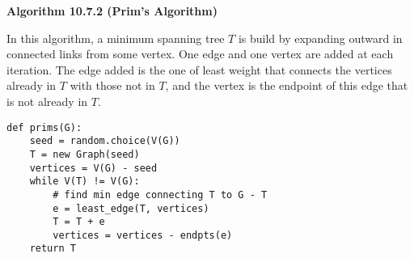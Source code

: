 \documentclass[a4paper]{article}
\newcommand{\subheading}[1]{{\scriptsize\textbf{#1}}}
\begin{document}
\begin{multicols*}{4}
\subheading{Algorithm 10.7.2 (Prim's Algorithm)}

In this algorithm, a minimum spanning tree $T$ is build by expanding outward in
connected links from some vertex. One edge and one vertex are added at each
iteration. The edge added is the one of least weight that connects the vertices
already in $T$ with those not in $T$, and the vertex is the endpoint of this
edge that is not already in $T$.
\begin{center}
\begin{BVerbatim}
def prims(G):
    seed = random.choice(V(G))
    T = new Graph(seed)
    vertices = V(G) - seed
    while V(T) != V(G):
        # find min edge connecting T to G - T
        e = least_edge(T, vertices)
        T = T + e
        vertices = vertices - endpts(e)
    return T
\end{BVerbatim}
\end{center}

\end{multicols*}
\end{document}
